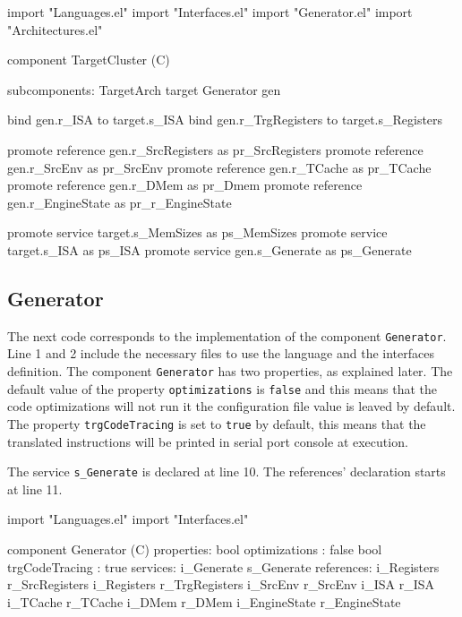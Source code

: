 \documentclass[11pt]{report}
\begin{document}
	\begin{EL}
		import "Languages.el"
		import "Interfaces.el"
		import "Generator.el"
		import "Architectures.el"
		
		component TargetCluster (C)
		{
			subcomponents:
			TargetArch target
			Generator gen 
			
			bind gen.r_ISA to target.s_ISA
			bind gen.r_TrgRegisters to target.s_Registers
			
			promote reference gen.r_SrcRegisters as pr_SrcRegisters
			promote reference gen.r_SrcEnv 		 as pr_SrcEnv
			promote reference gen.r_TCache 		 as pr_TCache
			promote reference gen.r_DMem		 as pr_Dmem
			promote reference gen.r_EngineState  as pr_r_EngineState
			
			promote service target.s_MemSizes as ps_MemSizes
			promote service target.s_ISA as ps_ISA	
			promote service gen.s_Generate as ps_Generate
		}
	\end{EL}
	
	\subsection*{Generator}
	
	\par The next code corresponds to the implementation of the component \texttt{Generator}. Line 1 and 2 include the necessary files to use the language and the interfaces definition. The component \texttt{Generator} has two properties, as explained later. The default value of the property \texttt{optimizations} is \texttt{false} and this means that the code optimizations will not run it the configuration file value is leaved by default. The property \texttt{trgCodeTracing} is set to \texttt{true} by default, this means that the translated instructions will be printed in serial port console at execution.
	\par The service \texttt{s\_Generate} is declared at line 10. The references' declaration starts at line 11.
	
	\begin{EL}
		import "Languages.el"
		import "Interfaces.el"
		
		component Generator (C)
		{
			properties:
				bool optimizations : false
				bool trgCodeTracing : true
			services:
				i_Generate s_Generate	
			references:
				i_Registers r_SrcRegisters
				i_Registers r_TrgRegisters
				i_SrcEnv r_SrcEnv
				i_ISA r_ISA
				i_TCache r_TCache
				i_DMem r_DMem				
				i_EngineState r_EngineState
		}
	\end{EL}
	
\end{document}
